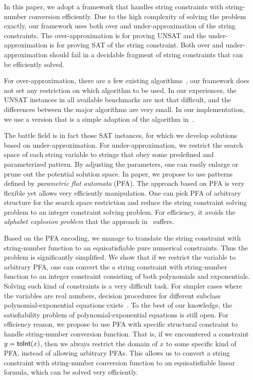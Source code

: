 \documentclass[sigplan,review,anonymous]{acmart}\settopmatter{printfolios=true,printccs=false,printacmref=false}
\begin{document}
In this paper, we adopt a framework that handles string constraints with string-number conversion efficiently. Due to the high complexity of solving the problem exactly, our framework uses both over and under-approximation of the string constraints. The over-approximation is for proving UNSAT and the under-approximation is for proving SAT of the string constraint. Both over and under-approximation should fail in a decidable fragment of string constraints that can be efficiently solved. 

For over-approximation, there are a few existing algorithms~\cite{parosh2019chain,z3,chen2019decision}, our framework does not set any restriction on which algorithm to be used. In our experiences, the UNSAT instances in all available benchmarks are not that difficult, and the differences between the major algorithms are very small. In our implementation, we use a version that is a simple adaption of the algorithm in~\cite{parosh2019chain}.


The battle field is in fact those SAT instances, for which we develop solutions based on under-approximation. For under-approximation, we restrict the search space of each string variable to strings that obey some predefined and parameterized pattern. By adjusting the parameters, one can easily enlarge or prune out the potential solution space. In paper, we propose to use patterns defined by \emph{parametric flat automata} (PFA). The approach based on PFA is very flexible yet allows very efficiently manipulation. One can pick PFA of arbitrary structure for the search space restriction and reduce the string constraint solving problem to an integer constraint solving problem. For efficiency, it avoids the \textit{alphabet 
explosion problem} that the approach in~\cite{abdulla2017flatten} suffers.

Based on the PFA encoding, we manage to translate the string constraint with string-number function to an equisatisfiable pure numerical constraints. Thus the problem is significantly simplified. We show that if we restrict the variable to arbitrary PFA, one can convert the a string constraint with string-number function to an integer constraint consisting of both polynomials and exponentials. Solving such kind of constraints is a very difficult task. For simpler cases where the variables are real numbers, decision procedures for different subclass polynomial-exponential equations exists~\cite{gan2015decidability,kincaid2019closed,achatz2008deciding}. To the best of our knowledge, the satisfiability problem of polynomial-exponential equations is still open. For efficiency reason, we propose to use PFA with specific structural constraint to handle string-number conversion function. That is, if we encountered a constraint $y=\mbox{\textsf{toInt}($x$)}$, then we always restrict the domain of $x$ to some specific kind of PFA, instead of allowing arbitrary PFAs. This allows us to convert a string constraint with string-number conversion function to an equisatisfiable linear formula, which can be solved very efficiently. 
\end{document}
